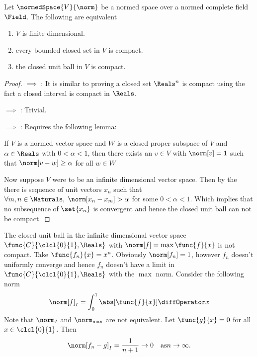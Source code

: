 \begin{theorem}\label{th:CompactnessOfFiniteDimensional}
    Let \(\normedSpace{V}{\norm}\) be a normed space over a normed complete field \(\Field\). The following are equivalent
    \begin{enumerate}
        \item \(V\) is finite dimensional. \label{it:COFD_1}
        \item every bounded closed set in \(V\) is compact. \label{it:COFD_2}
        \item the closed unit ball in \(V\) is compact. \label{it:COFD_3}
    \end{enumerate}
\end{theorem}
\begin{proof}
     \(\implies\) : It is similar to proving a closed set \(\Reals^n\) is compact using the fact a closed interval is compact in \(\Reals\).

     \(\implies\) : Trivial.

     \(\implies\) : Requires the following lemma:
    \begin{lemma}  \label{lm:RieszsLemma}
        If \(V\) is a normed vector space and \(W\) is a closed proper subspace of \(V\) and \(\alpha \in \Reals\) with \(0 < \alpha < 1\), then there exists an \(v \in V\) with \(\norm[v] = 1\) such that \(\norm[v- w] \geq \alpha \) for all \(w \in W\)
    \end{lemma}
    Now suppose \(V\) were to be an infinite dimensional vector space. Then by the  there is sequence of unit vectors \({x_n}\) such that \(\forall m,n \in \Naturals, \; \norm[x_n - x_m] > \alpha\) for some \(0 <\alpha < 1\). Which implies that no subsequence of \(\set{x_n}\) is convergent and hence the closed unit ball can not be compact.
\end{proof}

\begin{example}
    The closed unit ball in the infinite dimensional vector space \(\func{C}{\clcl{0}{1},\Reals}\) with \(\norm[f] = \max \func{f}{x}\) is not compact.  Take \(\func{f_n}{x} = x^n\). Obviously \(\norm[f_n] = 1\), however \(f_n\) doesn't uniformly converge and hence \(f_n\) doesn't have a limit in \(\func{C}{\clcl{0}{1},\Reals}\) with the \(\max\) norm. Consider the following norm
    \begin{equation*}
        \norm[f]_I = \int_0^1 \abs[\func{f}{x}] \diffOperator x
    \end{equation*}
    Note that \(\norm_I\) and \(\norm_{\max} \) are not equivalent. Let \(\func{g}{x} = 0\) for all \(x \in \clcl{0}{1}\). Then
    \begin{equation*}
        \norm[f_n - g]_I = \dfrac{1}{n+1} \to 0 \quad \text{as} n \to \infty.
    \end{equation*}
\end{example}


